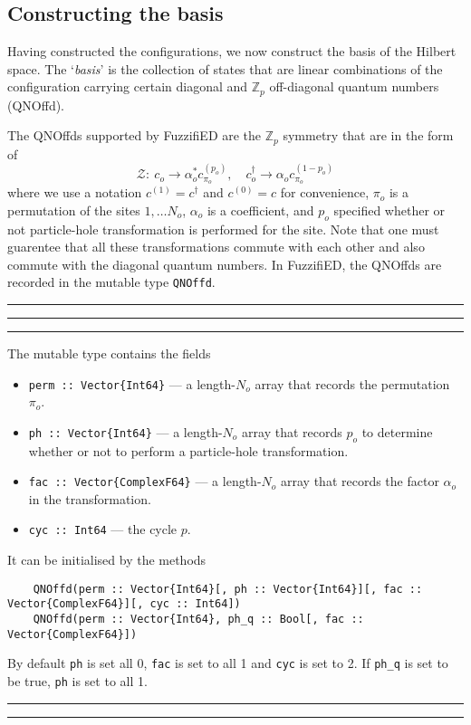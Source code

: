 \documentclass{timesjhep}
\newenvironment{block}[1]{\vspace{0.4\baselineskip}\hrule\vspace{0.10\baselineskip}\hrule\vspace{0.30\baselineskip}{\bfseries #1}\vspace{0.2\baselineskip}\hrule\vspace{0.3\baselineskip}
}{\vspace{0.2\baselineskip}\hrule\vspace{0.10\baselineskip}\hrule\vspace{0.5\baselineskip}}
\begin{document}
\subsection{Constructing the basis}
\label{sec:ed_basis}

Having constructed the configurations, we now construct the basis of the Hilbert space. The `\textit{basis}' is the collection of states that are linear combinations of the configuration carrying certain diagonal and $\mathbb{Z}_p$ off-diagonal quantum numbers (QNOffd). 

The QNOffds supported by FuzzifiED are the $\mathbb{Z}_p$ symmetry that are in the form of 
\begin{equation}
    \mathcal{Z}:\ c_o\to \alpha_o^* c^{(p_o)}_{\pi_o},\quad c_o^\dagger\to \alpha_o c^{(1-p_o)}_{\pi_o}
\end{equation}
where we use a notation $c^{(1)}=c^\dagger$ and $c^{(0)}=c$ for convenience, $\pi_o$ is a permutation of the sites $1,\dots N_o$, $\alpha_o$ is a coefficient, and $p_o$ specified whether or not particle-hole transformation is performed for the site. Note that one must guarentee that all these transformations commute with each other and also commute with the diagonal quantum numbers. In FuzzifiED, the QNOffds are recorded in the mutable type \lstinline|QNOffd|. 

\begin{block}{\lstinline|QNOffd| --- Type}
The mutable type contains the fields
\begin{itemize}
    \item \lstinline|perm :: Vector{Int64}| --- a length-$N_o$ array that records the permutation $\pi_o$.
    \item \lstinline|ph :: Vector{Int64}| --- a length-$N_o$ array that records $p_o$ to determine whether or not to perform a particle-hole transformation.
    \item \lstinline|fac :: Vector{ComplexF64}| --- a length-$N_o$ array that records the factor $\alpha_o$ in the transformation.
    \item \lstinline|cyc :: Int64| --- the cycle $p$. 
\end{itemize}
It can be initialised by the methods
\begin{lstlisting}
    QNOffd(perm :: Vector{Int64}[, ph :: Vector{Int64}][, fac :: Vector{ComplexF64}][, cyc :: Int64])
    QNOffd(perm :: Vector{Int64}, ph_q :: Bool[, fac :: Vector{ComplexF64}])
\end{lstlisting}
By default \lstinline|ph| is set all 0, \lstinline|fac| is set to all 1 and \lstinline|cyc| is set to 2. If \lstinline|ph_q| is set to be true, \lstinline|ph| is set to all 1. 
\end{block}
\end{document}
